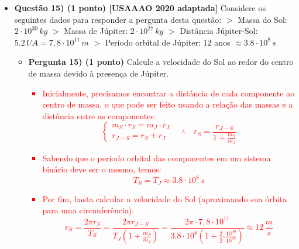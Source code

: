 \documentclass[a4paper, 12pt]{article}
\newcommand{\red}[1]{\textcolor{red}{#1}}
\begin{document}
\begin{flushleft}
\begin{itemize}
            \item \textbf{Questão 15) (1 ponto) [USAAAO 2020 adaptada]} Considere os seguintes dados para responder a pergunta desta questão: \linebreak\linebreak $>$ Massa do Sol: $2 \cdot 10^{30} \, kg$ \linebreak $>$ Massa de Júpiter: $2 \cdot 10^{27} \, kg$ \linebreak $>$ Distância Júpiter-Sol: $5.2 \, UA = 7,8 \cdot 10^{11} \, m$ \linebreak $>$ Período orbital de Júpiter: $12$ anos $\approx 3.8 \cdot 10^8 \, s$
                \begin{itemize}
                    \item \textbf{Pergunta 15) (1 ponto)} Calcule a velocidade do Sol ao redor do centro de massa devido à presença de Júpiter.
                        \red{\begin{itemize}
                            \item Inicialmente, precisamos encontrar a distância de cada componente ao centro de massa, o que pode ser feito usando a relação das massas e a distância entre as componentes:
                                \begin{equation*}
                                    \begin{cases}
                                        m_S\cdot r_S=m_J\cdot r_J \\
                                        r_{J-S} = r_S+r_J
                                    \end{cases} \quad \therefore \quad r_S=\frac{r_{J-S}}{1+\frac{m_S}{m_J}}
                                \end{equation*}
                            \item Sabendo que o período orbital das componentes em um sistema binário deve ser o mesmo, temos:
                                \begin{equation*}
                                    T_S=T_J\approx3.8 \cdot 10^8 \, s
                                \end{equation*}
                            \item Por fim, basta calcular a velocidade do Sol (aproximando sua órbita para uma circunferência):
                                \begin{equation*}
                                    v_S = \frac{2\pi r_S}{T_S} = \frac{2 \pi r_{J-S}}{T_J\left(1+\frac{m_S}{m_J}\right)} = \frac{2 \pi \cdot 7,8 \cdot 10^{11}}{3.8 \cdot 10^8 \left(1+\frac{2 \cdot 10^{30}}{2 \cdot 10^{27}}\right)} \approx 12 \, \frac{m}{s}

\end{equation*}
\end{itemize}}
\end{itemize}
\end{itemize}
\end{flushleft}
\end{document}
